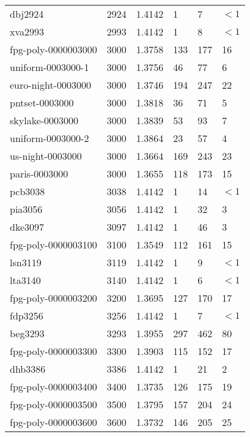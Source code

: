 \begin{longtable}{|lrrlll|}
dbj2924 & 2924 & \num{1.4142} & \num{1} & \num{7} & $<1$ \\
xva2993 & 2993 & \num{1.4142} & \num{1} & \num{8} & $<1$ \\
fpg-poly-0000003000 & 3000 & \num{1.3758} & \num{133} & \num{177} & \num{16} \\
uniform-0003000-1 & 3000 & \num{1.3756} & \num{46} & \num{77} & \num{6} \\
euro-night-0003000 & 3000 & \num{1.3746} & \num{194} & \num{247} & \num{22} \\
pntset-0003000 & 3000 & \num{1.3818} & \num{36} & \num{71} & \num{5} \\
skylake-0003000 & 3000 & \num{1.3839} & \num{53} & \num{93} & \num{7} \\
uniform-0003000-2 & 3000 & \num{1.3864} & \num{23} & \num{57} & \num{4} \\
us-night-0003000 & 3000 & \num{1.3664} & \num{169} & \num{243} & \num{23} \\
paris-0003000 & 3000 & \num{1.3655} & \num{118} & \num{173} & \num{15} \\
pcb3038 & 3038 & \num{1.4142} & \num{1} & \num{14} & $<1$ \\
pia3056 & 3056 & \num{1.4142} & \num{1} & \num{32} & \num{3} \\
dke3097 & 3097 & \num{1.4142} & \num{1} & \num{46} & \num{3} \\
fpg-poly-0000003100 & 3100 & \num{1.3549} & \num{112} & \num{161} & \num{15} \\
lsn3119 & 3119 & \num{1.4142} & \num{1} & \num{9} & $<1$ \\
lta3140 & 3140 & \num{1.4142} & \num{1} & \num{6} & $<1$ \\
fpg-poly-0000003200 & 3200 & \num{1.3695} & \num{127} & \num{170} & \num{17} \\
fdp3256 & 3256 & \num{1.4142} & \num{1} & \num{7} & $<1$ \\
beg3293 & 3293 & \num{1.3955} & \num{297} & \num{462} & \num{80} \\
fpg-poly-0000003300 & 3300 & \num{1.3903} & \num{115} & \num{152} & \num{17} \\
dhb3386 & 3386 & \num{1.4142} & \num{1} & \num{21} & \num{2} \\
fpg-poly-0000003400 & 3400 & \num{1.3735} & \num{126} & \num{175} & \num{19} \\
fpg-poly-0000003500 & 3500 & \num{1.3795} & \num{157} & \num{204} & \num{24} \\
fpg-poly-0000003600 & 3600 & \num{1.3732} & \num{146} & \num{205} & \num{25} \\

\end{longtable}
